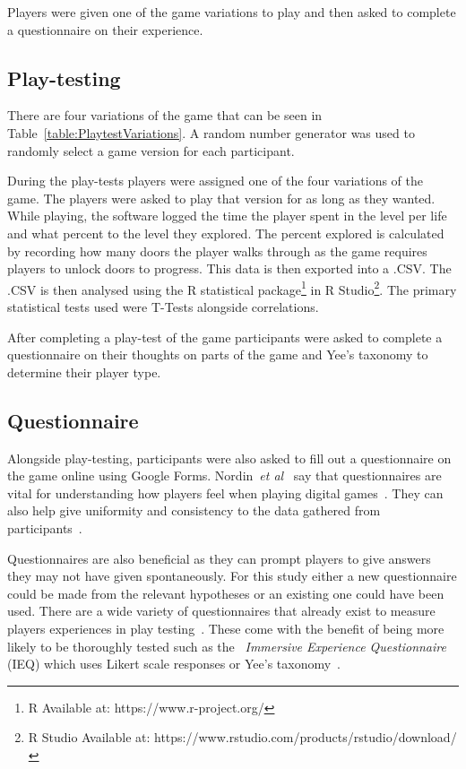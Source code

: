 \documentclass[journal]{IEEEtran}
\begin{document}
	Players were given one of the game variations to play and then asked to complete a questionnaire on their experience. 
	
	\subsection{Play-testing}
	There are four variations of the game that can be seen in Table~\ref{table:PlaytestVariations}.  A random number generator was used to randomly select a game version for each participant.    
	
	During the play-tests players were assigned one of the four variations of the game. The players were asked to play that version for as long as they wanted. While playing, the software logged the time the player spent in the level per life and what percent to the level they explored. The percent explored is calculated by recording how many doors the player walks through as the game requires players to unlock doors to progress. This data is then exported into a .CSV. The .CSV is then analysed using the R statistical package\footnote[2]{R Available at: https://www.r-project.org/} in R Studio\footnote[3]{R Studio Available at: https://www.rstudio.com/products/rstudio/download/}.  The primary statistical tests used were T-Tests alongside correlations.
	
	After completing a play-test of the game participants were asked to complete a questionnaire on their thoughts on parts of the game and Yee's taxonomy to determine their player type.
	
	\subsection{Questionnaire} \label{Questionnaire}
	
	Alongside play-testing, participants were also asked to fill out a questionnaire on the game online using Google Forms. Nordin~\textit{et al}~\cite{nordin2014} say that questionnaires are vital for understanding how players feel when playing digital games~\cite{nordin2014,Denisova2016}. They can also help give uniformity and consistency to the data gathered from participants~\cite{Denisova2016}.
	
	Questionnaires are also beneficial as they can prompt players to give answers they may not have given spontaneously. For this study either a new questionnaire could be made from the relevant hypotheses or an existing one could have been used. There are a wide variety of questionnaires that already exist to measure players experiences in play testing~\cite{nordin2014, Jennett2008}. These come with the benefit of being more likely to be thoroughly tested such as the~\textit{ Immersive Experience Questionnaire} (IEQ) which uses Likert scale responses or Yee's taxonomy~\cite{nordin2014, Jennett2008, Yee2006, Yee2012}.
	
\end{document}
